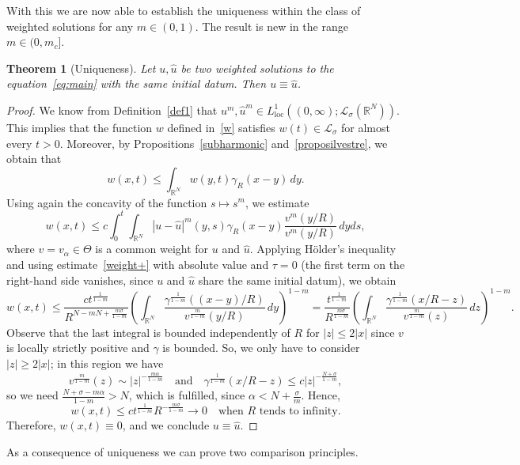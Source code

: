 \documentclass[leqno,12pt]{amsart}
\newtheorem{theorem}{Theorem}[section]
\theoremstyle{definition}
\theoremstyle{remark}
\numberwithin{equation}{section}
\begin{document}
With this we are now able to establish the uniqueness within the class of weighted solutions for any $m\in (0,1)$. The result is new in the range~$m\in(0,m_c]$.

\begin{theorem}[Uniqueness]\label{uniquenessthm}
   Let $u,\hat{u}$ be two weighted solutions to the equation~\eqref{eq:main} with the same initial datum. Then $u\equiv\hat{u}$.
\end{theorem}

\begin{proof}
We know from Definition~\ref{def1} that $u^m, \hat{u}^m \in L^1_{\mathrm{loc}}((0,\infty); \mathcal{L}_{\sigma}(\mathbb{R}^N))$. This implies that the function $w$ defined in~\eqref{w} satisfies $w(t) \in \mathcal{L}_{\sigma}$ for almost every $t>0$. Moreover, by Propositions~\ref{subharmonic} and~\ref{proposilvestre}, we obtain that 
\[
    w(x,t)\leq \int_{\mathbb{R}^N}^{}w(y,t)\gamma_R(x-y)\, dy.
\]
Using again the concavity of the function $s\mapsto s^m$, we estimate
$$
    w(x,t)\le c \int_{0}^{t}\int_{\mathbb{R}^N}^{}|u-\hat{u}|^m(y,s)\gamma_R(x-y)\frac{v^m(y/R)}{v^m(y/R)}\,dyds,
$$
where $v=v_\alpha\in\Theta$ is a common weight for $u$ and $\hat{u}$.
Applying Hölder’s inequality and using estimate~\eqref{weight+} with absolute value and $\tau=0$ (the first term on the right-hand side vanishes, since $u$ and $\hat u$ share the same initial datum), we obtain 
$$
  w(x,t)\le \frac{ct^{\frac{1}{1-m}}}{R^{N-mN+{\frac{m\sigma}{1-m}}}}\left(\int_{\mathbb{R}^N}^{}\frac{\gamma^{\frac{1}{1-m}}((x-y)/R)}{v^{\frac{m}{1-m}}(y/R)}\,dy\right)^{1-m}
  =\frac{t^{\frac{1}{1-m}}}{R^{{\frac{m\sigma}{1-m}}}}\left(\int_{\mathbb{R}^N}^{}\frac{\gamma^{\frac{1}{1-m}}(x/R-z)}{v^{\frac{m}{1-m}}(z)}\,dz\right)^{1-m}.
$$
Observe that the last integral is bounded independently of $R$ for $|z|\le 2|x|$ since $v$ is locally strictly positive and $\gamma$ is bounded. So, we only have to consider $|z|\ge 2|x|$; in this region we have 
$$
    v^{\frac{m}{1-m}}(z)\sim |z|^{-\frac{m\alpha}{1-m}}\quad\text{and}\quad \gamma^{\frac{1}{1-m}}(x/R-z)\le c|z|^{-\frac{N+\sigma}{1-m}},
$$
so we need $\frac{N+\sigma-m\alpha}{1-m}>N$, which is fulfilled, since $\alpha<N+\frac{\sigma}{m}$. Hence, 
$$
 w(x,t)\le ct^{\frac{1}{1-m}}R^{-\frac{m\sigma}{1-m}}\rightarrow0 \quad\text{when $R$ tends to infinity.}
$$
Therefore, $w(x,t)\equiv 0$, and we conclude $u\equiv \hat {u}$. 
\end{proof}

As a consequence of uniqueness we can prove two comparison principles.
\end{document}

